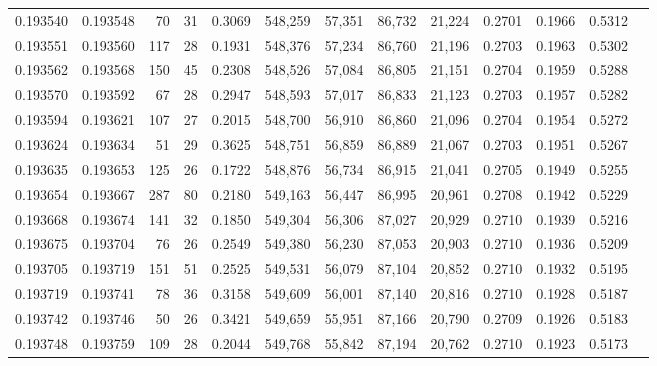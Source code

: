 \begin{tabular}{rrrrrrrrrrrrr}
0.193540 & 0.193548 &    70 &  31 &                                     0.3069 & 548,259 &  57,351 &  86,732 &  21,224 & 0.2701 & 0.1966 & 0.5312 \\
0.193551 & 0.193560 &   117 &  28 &                                     0.1931 & 548,376 &  57,234 &  86,760 &  21,196 & 0.2703 & 0.1963 & 0.5302 \\
0.193562 & 0.193568 &   150 &  45 &                                     0.2308 & 548,526 &  57,084 &  86,805 &  21,151 & 0.2704 & 0.1959 & 0.5288 \\
0.193570 & 0.193592 &    67 &  28 &                                     0.2947 & 548,593 &  57,017 &  86,833 &  21,123 & 0.2703 & 0.1957 & 0.5282 \\
0.193594 & 0.193621 &   107 &  27 &                                     0.2015 & 548,700 &  56,910 &  86,860 &  21,096 & 0.2704 & 0.1954 & 0.5272 \\
0.193624 & 0.193634 &    51 &  29 &                                     0.3625 & 548,751 &  56,859 &  86,889 &  21,067 & 0.2703 & 0.1951 & 0.5267 \\
0.193635 & 0.193653 &   125 &  26 &                                     0.1722 & 548,876 &  56,734 &  86,915 &  21,041 & 0.2705 & 0.1949 & 0.5255 \\
0.193654 & 0.193667 &   287 &  80 &                                     0.2180 & 549,163 &  56,447 &  86,995 &  20,961 & 0.2708 & 0.1942 & 0.5229 \\
0.193668 & 0.193674 &   141 &  32 &                                     0.1850 & 549,304 &  56,306 &  87,027 &  20,929 & 0.2710 & 0.1939 & 0.5216 \\
0.193675 & 0.193704 &    76 &  26 &                                     0.2549 & 549,380 &  56,230 &  87,053 &  20,903 & 0.2710 & 0.1936 & 0.5209 \\
0.193705 & 0.193719 &   151 &  51 &                                     0.2525 & 549,531 &  56,079 &  87,104 &  20,852 & 0.2710 & 0.1932 & 0.5195 \\
0.193719 & 0.193741 &    78 &  36 &                                     0.3158 & 549,609 &  56,001 &  87,140 &  20,816 & 0.2710 & 0.1928 & 0.5187 \\
0.193742 & 0.193746 &    50 &  26 &                                     0.3421 & 549,659 &  55,951 &  87,166 &  20,790 & 0.2709 & 0.1926 & 0.5183 \\
0.193748 & 0.193759 &   109 &  28 &                                     0.2044 & 549,768 &  55,842 &  87,194 &  20,762 & 0.2710 & 0.1923 & 0.5173 \\

\end{tabular}

